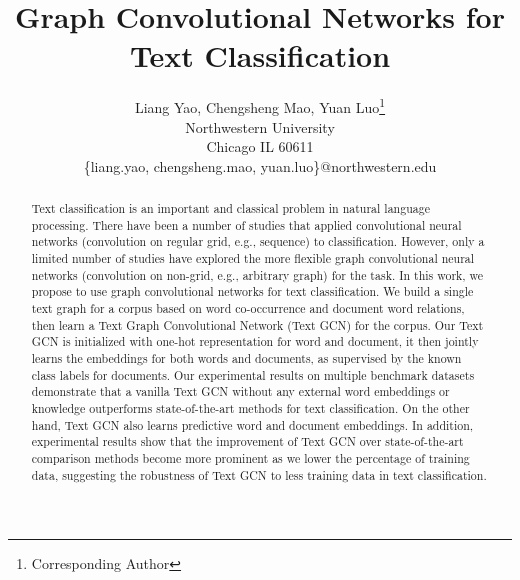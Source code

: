 \documentclass[letterpaper]{article} \usepackage{aaai19}  \usepackage{times}  \usepackage{helvet}  \usepackage{courier}  \usepackage{url}  \usepackage{graphicx}  \frenchspacing  \usepackage{amsmath}
\begin{document}
\title{Graph Convolutional Networks for Text Classification}
\author{Liang Yao, Chengsheng Mao, Yuan Luo\thanks{Corresponding Author}\\
Northwestern University\\
Chicago IL 60611\\
\{liang.yao, chengsheng.mao, yuan.luo\}@northwestern.edu\\
}
\maketitle
\begin{abstract}  
Text classification is an important and classical problem in natural language processing. There have been a number of studies that applied convolutional neural networks (convolution on regular grid, e.g., sequence) to classification. However, only a limited number of studies have explored the more flexible graph convolutional neural networks (convolution on non-grid, e.g., arbitrary graph) for the task. In this work, we propose to use graph convolutional networks for text classification. We build a single text graph for a corpus based on word co-occurrence and document word relations, then learn a Text Graph Convolutional Network (Text GCN) for the corpus. Our Text GCN is initialized with one-hot representation for word and document, it then jointly learns the embeddings for both words and documents, as supervised by the known class labels for documents. Our experimental results on multiple benchmark datasets demonstrate that a vanilla Text GCN without any external word embeddings or knowledge outperforms state-of-the-art methods for text classification. On the other hand, Text GCN also learns predictive word and document embeddings. In addition, experimental results show that the improvement of Text GCN over state-of-the-art comparison methods become more prominent as we lower the percentage of training data, suggesting the robustness of Text GCN to less training data in text classification.
\end{abstract}
\end{document}
